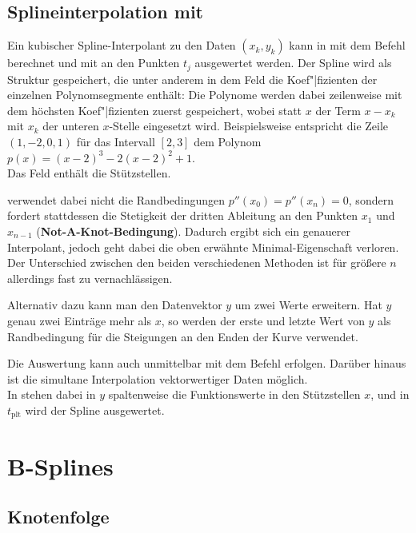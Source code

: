 \subsection{%
    Splineinterpolation mit \matlab{}%
}

Ein kubischer Spline-Interpolant zu den Daten $(x_k, y_k)$ kann in \matlab{}
mit dem Befehl \\
 berechnet
und mit  an den Punkten $t_j$ ausgewertet werden.
Der Spline wird als Struktur gespeichert, die unter anderem in dem Feld
 die Koef"|fizienten der einzelnen Polynomsegmente enthält:
Die Polynome werden dabei zeilenweise mit dem höchsten Koef"|fizienten zuerst
gespeichert, wobei statt $x$ der Term $x - x_k$ mit $x_k$ der unteren
$x$-Stelle eingesetzt wird.
Beispielsweise entspricht die Zeile $(1, -2, 0, 1)$ für das Intervall $[2, 3]$
dem Polynom $p(x) = (x - 2)^3 - 2(x - 2)^2 + 1$. \\
Das Feld  enthält die Stützstellen.

\matlab{} verwendet dabei nicht die Randbedingungen $p''(x_0) = p''(x_n) = 0$,
sondern fordert stattdessen die Stetigkeit der dritten Ableitung an den Punkten
$x_1$ und $x_{n-1}$ (\textbf{Not-A-Knot-Bedingung}).
Dadurch ergibt sich ein genauerer Interpolant, jedoch geht dabei die oben
erwähnte Minimal-Eigenschaft verloren.
Der Unterschied zwischen den beiden verschiedenen Methoden ist für
größere $n$ allerdings fast zu vernachlässigen.

Alternativ dazu kann man den Datenvektor $y$ um zwei Werte erweitern.
Hat $y$ genau zwei Einträge mehr als $x$, so werden der erste und letzte Wert
von $y$ als Randbedingung für die Steigungen an den Enden der Kurve verwendet.

Die Auswertung kann auch unmittelbar mit dem Befehl  erfolgen.
Darüber hinaus ist die simultane Interpolation vektorwertiger Daten möglich. \\
In  stehen dabei in $y$ spaltenweise die
Funktionswerte in den Stützstellen $x$, und in $t_\text{plt}$ wird der Spline
ausgewertet.

\pagebreak

\section{%
    B-Splines%
}

\subsection{%
    Knotenfolge
}

